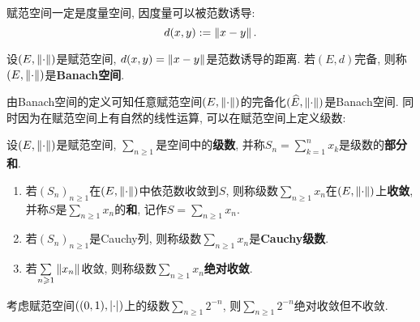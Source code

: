 	\begin{Remark}
	赋范空间一定是度量空间, 因度量可以被范数诱导:
	\[
	d(x,y):=\left\| x-y \right\|.
	\]
	\end{Remark}
	
	\begin{Definition}[Banach空间]\label{def:Banach空间}
	设$ (E,\left\| \cdot \right\|) $是赋范空间, $ d(x,y)=\left\| x-y \right\| $是范数诱导的距离. 若$ (E,d) $完备, 则称$ (E,\left\| \cdot \right\|) $是\textbf{Banach空间}.
	\end{Definition}
	
	由Banach空间的定义可知任意赋范空间$ (E,\left\| \cdot \right\|) $的完备化$ (\widehat{E},\left\| \cdot \right\|) $是Banach空间. 同时因为在赋范空间上有自然的线性运算, 可以在赋范空间上定义级数:
	
	\begin{Definition}[级数]\label{def:级数}
	设$ (E,\left\| \cdot \right\|) $是赋范空间, $ \sum\limits_{n\geqslant 1} $是空间中的\textbf{级数}, 并称$ S_n=\sum\limits_{k=1}^nx_k $是级数的\textbf{部分和}.
	
	\begin{enumerate}[(1)]
	\item 若$ (S_n)_{n\geqslant 1} $在$ (E,\left\| \cdot \right\|) $中依范数收敛到$ S $, 则称级数$ \sum\limits_{n\geqslant 1}x_n $在$ (E,\left\| \cdot \right\|) $上\textbf{收敛}, 并称$ S $是$ \sum\limits_{n\geqslant 1}x_n $的\textbf{和}, 记作$ S=\sum\limits_{n\geqslant 1}x_n $.
	
	\item 若$ (S_n)_{n\geqslant 1} $是Cauchy列, 则称级数$ \sum\limits_{n\geqslant 1}x_n $是\textbf{Cauchy级数}.
	
	\item 若$ \sum\limits_{n\geqslant 1}\left\| x_n \right\| $收敛, 则称级数$ \sum\limits_{n\geqslant 1}x_n $\textbf{绝对收敛}.
	\end{enumerate}
	\end{Definition}
	
	\begin{Remark}
	考虑赋范空间$ ((0,1),\left| \cdot \right| ) $上的级数$ \sum\limits_{n\geqslant 1}2^{-n} $, 则$ \sum\limits_{n\geqslant 1}2^{-n} $绝对收敛但不收敛.
	\end{Remark}
	

